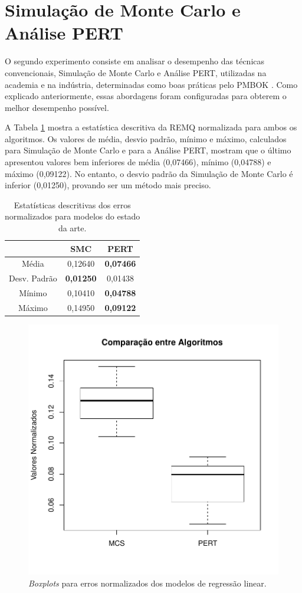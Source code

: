 \section{Simulação de Monte Carlo e Análise PERT}

O segundo experimento consiste em analisar o desempenho das técnicas convencionais, Simulação de Monte Carlo e Análise PERT, utilizadas na academia e na indústria, determinadas como boas práticas pelo PMBOK \cite{PMBOK2008}. Como explicado anteriormente, essas abordagens foram configuradas para obterem o melhor desempenho possível.

A Tabela \ref{tab:arte_descriptive} mostra a estatística descritiva da REMQ normalizada para ambos os algoritmos. Os valores de média, desvio padrão, mínimo e máximo, calculados para Simulação de Monte Carlo e para a Análise PERT, mostram que o último apresentou valores bem inferiores de média (0,07466), mínimo (0,04788) e máximo (0,09122). No entanto, o desvio padrão da Simulação de Monte Carlo é inferior (0,01250), provando ser um método mais preciso.

\begin{table}[h]
\caption{Estatísticas descritivas dos erros normalizados para modelos do estado da arte.}\label{tab:arte_descriptive} \centering
\begin{tabular}{|c|c|c|}
  \hline
   & SMC & PERT \\
  \hline
  Média & 0,12640 & \textbf{0,07466}   \\
  \hline
  Desv. Padrão & \textbf{0,01250} & 0,01438   \\
  \hline
  Mínimo & 0,10410 & \textbf{0,04788}   \\
  \hline
  Máximo & 0,14950 & \textbf{0,09122}   \\
  \hline
\end{tabular}
\end{table}

\begin{figure}[h]
  \vspace{-0.2cm}
  \centering
  \includegraphics[trim = 1mm 12mm 1mm 1mm,clip,width=0.7\columnwidth]{image/arte_ex2.pdf}
  \caption{\textit{Boxplots} para erros normalizados dos modelos de regressão linear.}
  \label{fig:arte_result}
\end{figure}

